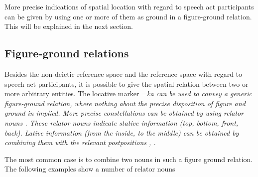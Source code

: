 More precise indications of spatial location with regard to speech act participants can be given by using one or more of them as ground in a figure-ground relation. This will be explained in the next section.






\subsection{Figure-ground relations}\label{sec:func:Figure-groundrelations}
Besides the non-deictic reference space and the reference space with regard to speech act participants, it is possible to give the spatial relation between two or more arbitrary entities. The locative marker \em =ka \em can be used to convey a generic figure-ground relation, where nothing about the precise disposition of figure and ground in implied. More precise constellations can be obtained by using relator nouns  \citep[cf.][]{Adelaar1991}. These relator nouns indicate stative information (top, bottom, front, back). Lative information (from the inside, to the middle) can be obtained by combining them with the relevant postpositions ,  .

The most common case is to combine two nouns in such a figure ground relation. The following examples show a number of relator nouns






